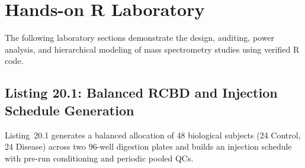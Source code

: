 \documentclass[11pt,twoside,openright]{book}
\begin{document}
\section{Hands-on R Laboratory}

The following laboratory sections demonstrate the design, auditing, power analysis, and hierarchical modeling of mass spectrometry studies using verified R code.

\subsection{Listing 20.1: Balanced RCBD and Injection Schedule Generation}

Listing~20.1 generates a balanced allocation of 48 biological subjects (24 Control, 24 Disease) across two 96-well digestion plates and builds an injection schedule with pre-run conditioning and periodic pooled QCs.
\end{document}
